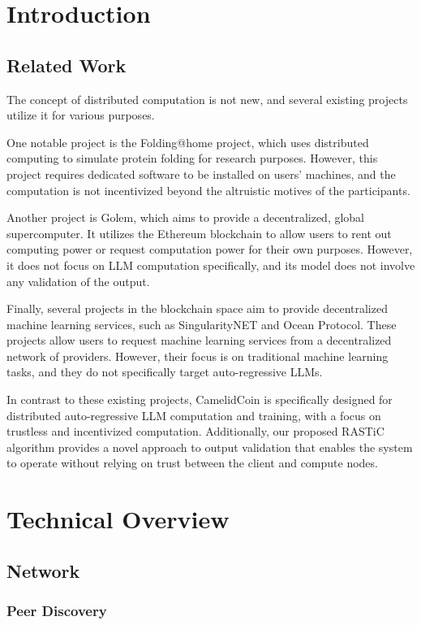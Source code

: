 \documentclass{article}
\begin{document}
\tableofcontents

\section{Introduction}
\subsection{Related Work}
The concept of distributed computation is not new, and several existing projects utilize it for various purposes.

One notable project is the Folding@home project, which uses distributed computing to simulate protein folding for research purposes.
However, this project requires dedicated software to be installed on users' machines, and the computation is not incentivized beyond the altruistic motives of the participants.

Another project is Golem, which aims to provide a decentralized, global supercomputer.
It utilizes the Ethereum blockchain to allow users to rent out computing power or request computation power for their own purposes.
However, it does not focus on LLM computation specifically, and its model does not involve any validation of the output.

Finally, several projects in the blockchain space aim to provide decentralized machine learning services, such as SingularityNET and Ocean Protocol.
These projects allow users to request machine learning services from a decentralized network of providers.
However, their focus is on traditional machine learning tasks, and they do not specifically target auto-regressive LLMs.

In contrast to these existing projects, CamelidCoin is specifically designed for distributed auto-regressive LLM computation and training, with a focus on trustless and incentivized computation.
Additionally, our proposed \ac{RASTiC} algorithm provides a novel approach to output validation that enables the system to operate without relying on trust between the client and compute nodes.

\section{Technical Overview}

\subsection{Network}
\subsubsection{Peer Discovery}
\end{document}
